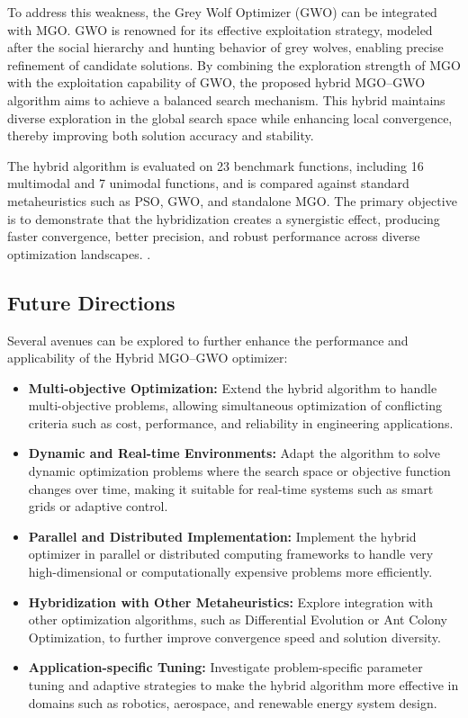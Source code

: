 \documentclass[12pt,a4paper]{article}
\begin{document}
To address this weakness, the Grey Wolf Optimizer (GWO) can be integrated with MGO. GWO is renowned for its effective exploitation strategy, modeled after the social hierarchy and hunting behavior of grey wolves, enabling precise refinement of candidate solutions. By combining the exploration strength of MGO with the exploitation capability of GWO, the proposed hybrid MGO--GWO algorithm aims to achieve a balanced search mechanism. This hybrid maintains diverse exploration in the global search space while enhancing local convergence, thereby improving both solution accuracy and stability.

The hybrid algorithm is evaluated on 23 benchmark functions, including 16 multimodal and 7 unimodal functions, and is compared against standard metaheuristics such as PSO, GWO, and standalone MGO. The primary objective is to demonstrate that the hybridization creates a synergistic effect, producing faster convergence, better precision, and robust performance across diverse optimization landscapes.
.

\subsection{Future Directions}

Several avenues can be explored to further enhance the performance and applicability of the Hybrid MGO--GWO optimizer:

\begin{itemize}
    \item \textbf{Multi-objective Optimization:} Extend the hybrid algorithm to handle multi-objective problems, allowing simultaneous optimization of conflicting criteria such as cost, performance, and reliability in engineering applications.
    
    \item \textbf{Dynamic and Real-time Environments:} Adapt the algorithm to solve dynamic optimization problems where the search space or objective function changes over time, making it suitable for real-time systems such as smart grids or adaptive control.
    
    \item \textbf{Parallel and Distributed Implementation:} Implement the hybrid optimizer in parallel or distributed computing frameworks to handle very high-dimensional or computationally expensive problems more efficiently.
    
    \item \textbf{Hybridization with Other Metaheuristics:} Explore integration with other optimization algorithms, such as Differential Evolution or Ant Colony Optimization, to further improve convergence speed and solution diversity.
    
    \item \textbf{Application-specific Tuning:} Investigate problem-specific parameter tuning and adaptive strategies to make the hybrid algorithm more effective in domains such as robotics, aerospace, and renewable energy system design.
\end{itemize}





\newpage
\nocite{*}


\end{document}

